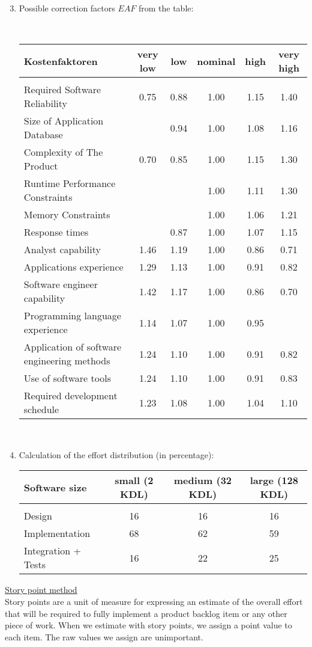 \newpage
\begin{enumerate}\setcounter{enumi}{2}
\item Possible correction factors $EAF$ from the table:
\ifslides
\\{\footnotesize
\else
\\[1.5ex]
\fi
\begin{tabular}{|lccccc|}\hline
Kostenfaktoren & very low & low & nominal & high & very high \\
        \hline & & & & &\\
Required Software Reliability & 0.75 & 0.88 & 1.00 & 1.15 & 1.40  \\
Size of Application Database &  & 0.94 & 1.00 & 1.08 & 1.16  \\
Complexity of The Product & 0.70 & 0.85 & 1.00 & 1.15 & 1.30  \\
Runtime Performance Constraints & & & 1.00 & 1.11 & 1.30 \\
Memory Constraints & & & 1.00 & 1.06 & 1.21\\
Response times & & 0.87 & 1.00 & 1.07 & 1.15 \\
Analyst capability & 1.46 & 1.19 & 1.00 & 0.86 & 0.71 \\
Applications experience & 1.29 & 1.13 & 1.00 & 0.91 & 0.82 \\
Software engineer capability & 1.42 & 1.17 & 1.00 & 0.86 & 0.70 \\
Programming language experience & 1.14 & 1.07 & 1.00 & 0.95 & \\
Application of software engineering methods & 1.24 & 1.10 & 1.00 & 0.91 & 0.82 \\
Use of software tools & 1.24 & 1.10 & 1.00 & 0.91 & 0.83 \\
Required development schedule & 1.23 & 1.08 & 1.00 & 1.04 & 1.10 \\
\hline
\end{tabular}
\ifslides
}
\fi
\vspace{0.8cm}\\
\item Calculation of the effort distribution (in percentage):
\vspace{0.8cm}\\
\begin{tabular}{|lccc|}\hline
Software size & small (2 KDL) & medium (32 KDL) & large (128 KDL) \\ \hline
 & & & \\
Design & 16 & 16 & 16 \\
Implementation & 68 & 62 & 59 \\
Integration + Tests & 16 & 22 & 25 \\ \hline
\end{tabular}
\end{enumerate}
\newpage
\underline{Story point method}\\
Story points are a unit of measure for expressing an estimate of
the overall effort that will be required to fully implement a
product backlog item or any other piece of work. When we
estimate with story points, we assign a point value to each item.
The raw values we assign are unimportant.\\

